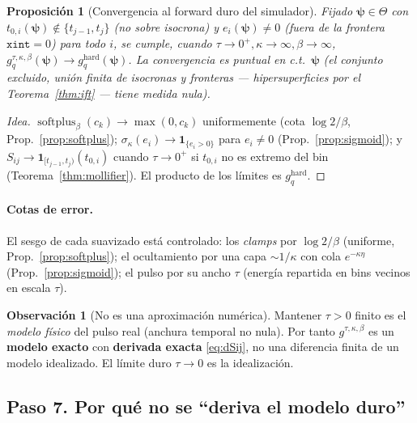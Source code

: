 \documentclass[11pt,a4paper]{article}
\theoremstyle{plain}
\newtheorem{proposition}[theorem]{Proposici\'on}
\theoremstyle{definition}
\newtheorem{remark}{Observaci\'on}
\newcommand{\vect}[1]{\boldsymbol{#1}}
\newcommand{\softplus}{\operatorname{softplus}}
\begin{document}
\begin{proposition}[Convergencia al forward duro del simulador]\label{prop:consistencia}
Fijado $\vect{\psi}\in\Theta$ con $t_{0,i}(\vect{\psi})\notin\{t_{j-1},t_j\}$ (no
sobre isocrona) y $e_i(\vect{\psi})\neq0$ (fuera de la frontera $\texttt{xint}=0$)
para todo $i$, se cumple, cuando $\tau\to0^+,\kappa\to\infty,\beta\to\infty$,
$g^{\tau,\kappa,\beta}_q(\vect{\psi})\to g^{\mathrm{hard}}_q(\vect{\psi})$. La
convergencia es puntual en c.t.\ $\vect{\psi}$ (el conjunto excluido, uni\'on
finita de isocronas y fronteras --- hipersuperficies por el
Teorema~\ref{thm:ift} --- tiene medida nula).
\end{proposition}
\begin{proof}[Idea]
$\softplus_\beta(c_k)\to\max(0,c_k)$ uniformemente (cota $\log2/\beta$,
Prop.~\ref{prop:softplus}); $\sigma_\kappa(e_i)\to\mathbf 1_{\{e_i>0\}}$ para
$e_i\neq0$ (Prop.~\ref{prop:sigmoid}); y $S_{ij}\to\mathbf
1_{[t_{j-1},t_j)}(t_{0,i})$ cuando $\tau\to0^+$ si $t_{0,i}$ no es extremo del bin
(Teorema~\ref{thm:mollifier}). El producto de los l\'imites es
$g^{\mathrm{hard}}_q$.
\end{proof}

\paragraph{Cotas de error.} El sesgo de cada suavizado est\'a controlado: los
\emph{clamps} por $\log2/\beta$ (uniforme, Prop.~\ref{prop:softplus}); el
ocultamiento por una capa $\sim1/\kappa$ con cola $e^{-\kappa\eta}$
(Prop.~\ref{prop:sigmoid}); el pulso por su ancho $\tau$ (energ\'ia repartida en
bins vecinos en escala $\tau$).

\begin{remark}[No es una aproximaci\'on num\'erica]
Mantener $\tau>0$ finito es el \emph{modelo f\'isico} del pulso real (anchura
temporal no nula). Por tanto $g^{\tau,\kappa,\beta}$ es un \textbf{modelo exacto}
con \textbf{derivada exacta} \eqref{eq:dSij}, no una diferencia finita de un
modelo idealizado. El l\'imite duro $\tau\to0$ es la idealizaci\'on.
\end{remark}

\subsection*{Paso 7. Por qu\'e no se ``deriva el modelo duro''}
\label{sec:intercambio}
\end{document}
